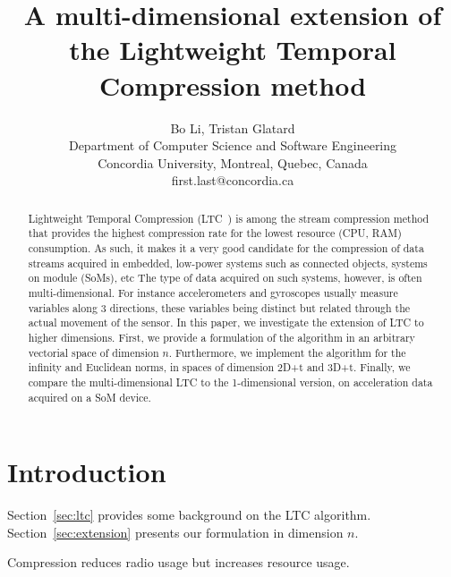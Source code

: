\documentclass[10pt, conference, compsocconf]{IEEEtran}
\begin{document}
\title{A multi-dimensional extension of the Lightweight Temporal Compression method}

\author{Bo Li, Tristan Glatard\\
  Department of Computer Science and Software Engineering\\ Concordia University, Montreal, Quebec, Canada\\
  {first.last}@concordia.ca \vspace*{-0.5cm}}

\maketitle

\begin{abstract}
Lightweight Temporal Compression
(LTC~\cite{schoellhammer2004lightweight}) is among the stream
compression method that provides the highest compression rate for the
lowest resource (CPU, RAM) consumption. As such, it makes it a very
good candidate for the compression of data streams acquired in
embedded, low-power systems such as connected
objects, systems on module (SoMs), etc The type of data acquired on
such systems, however, is often multi-dimensional. For instance
accelerometers and gyroscopes usually measure variables along 3
directions, these variables being distinct but related through the
actual movement of the sensor. In this paper, we investigate the
extension of LTC to higher dimensions. First, we provide a formulation of the algorithm
in an arbitrary vectorial space of dimension $n$. Furthermore, we
implement the algorithm for the infinity and Euclidean norms, in spaces of
dimension 2D+t and 3D+t. Finally, we compare the multi-dimensional LTC
to the 1-dimensional version, on acceleration data acquired on a SoM
device.
\end{abstract}

\section{Introduction}

Section~\ref{sec:ltc} provides some background on the LTC algorithm.
Section~\ref{sec:extension} presents our formulation in dimension $n$.


Compression reduces radio usage but increases resource usage.


\end{document}
